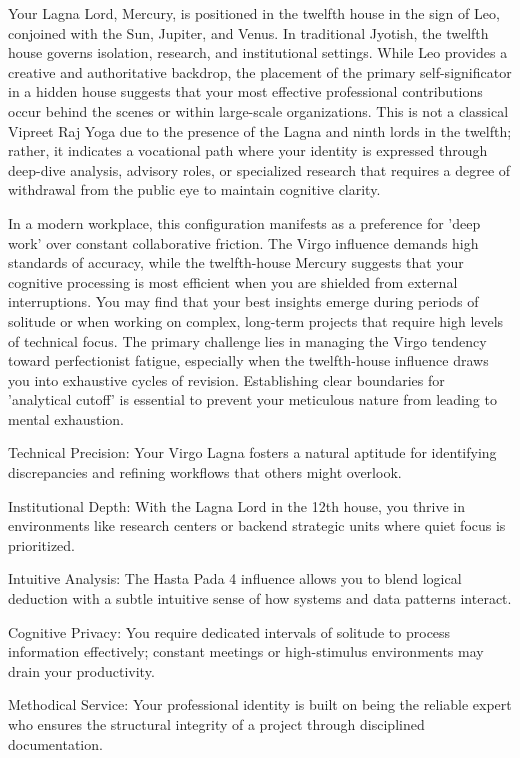 {\fontsize{9}{13}\selectfont Your Lagna Lord, Mercury, is positioned in the twelfth house in the sign of Leo, conjoined with the Sun, Jupiter, and Venus. In traditional Jyotish, the twelfth house governs isolation, research, and institutional settings. While Leo provides a creative and authoritative backdrop, the placement of the primary self-significator in a hidden house suggests that your most effective professional contributions occur behind the scenes or within large-scale organizations. This is not a classical Vipreet Raj Yoga due to the presence of the Lagna and ninth lords in the twelfth; rather, it indicates a vocational path where your identity is expressed through deep-dive analysis, advisory roles, or specialized research that requires a degree of withdrawal from the public eye to maintain cognitive clarity.}\par\vspace{1.8mm}

{\fontsize{9}{13}\selectfont In a modern workplace, this configuration manifests as a preference for 'deep work' over constant collaborative friction. The Virgo influence demands high standards of accuracy, while the twelfth-house Mercury suggests that your cognitive processing is most efficient when you are shielded from external interruptions. You may find that your best insights emerge during periods of solitude or when working on complex, long-term projects that require high levels of technical focus. The primary challenge lies in managing the Virgo tendency toward perfectionist fatigue, especially when the twelfth-house influence draws you into exhaustive cycles of revision. Establishing clear boundaries for 'analytical cutoff' is essential to prevent your meticulous nature from leading to mental exhaustion.}\par\vspace{1.8mm}

\begin{diamondlist}
  \item {\fontsize{8.5}{12}\selectfont Technical Precision: Your Virgo Lagna fosters a natural aptitude for identifying discrepancies and refining workflows that others might overlook.}
  \item {\fontsize{8.5}{12}\selectfont Institutional Depth: With the Lagna Lord in the 12th house, you thrive in environments like research centers or backend strategic units where quiet focus is prioritized.}
  \item {\fontsize{8.5}{12}\selectfont Intuitive Analysis: The Hasta Pada 4 influence allows you to blend logical deduction with a subtle intuitive sense of how systems and data patterns interact.}
  \item {\fontsize{8.5}{12}\selectfont Cognitive Privacy: You require dedicated intervals of solitude to process information effectively; constant meetings or high-stimulus environments may drain your productivity.}
  \item {\fontsize{8.5}{12}\selectfont Methodical Service: Your professional identity is built on being the reliable expert who ensures the structural integrity of a project through disciplined documentation.}
\end{diamondlist}

